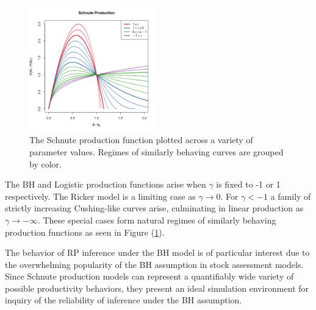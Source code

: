 %
\begin{figure}
\vspace{-0.6cm}
\includegraphics[width=0.49\textwidth]{../gpBias/g3.png}
\vspace{-0.5cm}
\caption{
The Schnute production function plotted across a variety of parameter
values. Regimes of similarly behaving curves are grouped by color.
}
\label{sRegimes}
\end{figure}

%
The BH and Logistic production functions arise when $\gamma$ is fixed to -1 or
1 respectively. The Ricker model is a limiting case as $\gamma\rightarrow0$. %
For $\gamma<-1$ a family of strictly increasing Cushing-like \cite{cushing_dependence_1971} 
curves arise, culminating in linear production as $\gamma\to-\infty$. These 
special cases form natural regimes of similarly behaving production functions 
as seen in Figure (\ref{sRegimes}).

%
The behavior of RP inference under the BH model is of particular interest due
to the overwhelming popularity of the BH assumption in stock assessment models. %
Since Schnute production models can represent a quantifiably wide variety
of possible productivity behaviors, they present an ideal simulation
environment for inquiry of the reliability of inference under the BH
assumption.


